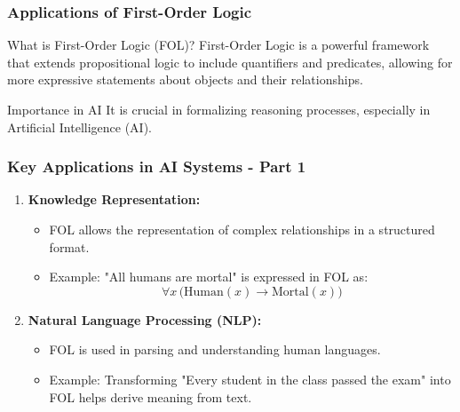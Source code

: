 \documentclass[aspectratio=169]{beamer}
\begin{document}
\begin{frame}[fragile]
    \frametitle{Applications of First-Order Logic}
    \begin{block}{What is First-Order Logic (FOL)?}
        First-Order Logic is a powerful framework that extends propositional logic to include quantifiers and predicates, allowing for more expressive statements about objects and their relationships.
    \end{block}
    \begin{block}{Importance in AI}
        It is crucial in formalizing reasoning processes, especially in Artificial Intelligence (AI).
    \end{block}
\end{frame}

\begin{frame}[fragile]
    \frametitle{Key Applications in AI Systems - Part 1}
    \begin{enumerate}
        \item \textbf{Knowledge Representation:}
            \begin{itemize}
                \item FOL allows the representation of complex relationships in a structured format.
                \item Example: "All humans are mortal" is expressed in FOL as: 
                \begin{equation}
                    \forall x \, \text{(Human}(x) \rightarrow \text{Mortal}(x))
                \end{equation}
            \end{itemize}
        
        \item \textbf{Natural Language Processing (NLP):}
            \begin{itemize}
                \item FOL is used in parsing and understanding human languages.
                \item Example: Transforming "Every student in the class passed the exam" into FOL helps derive meaning from text.
            \end{itemize}
    \end{enumerate}
\end{frame}
\end{document}

